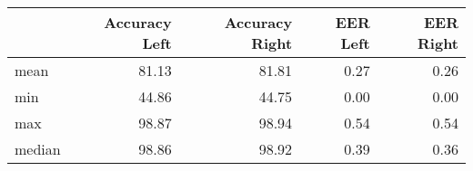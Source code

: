 \begin{tabular}{lrrrr}
\toprule
{} &  Accuracy Left &  Accuracy Right &  EER Left &  EER Right \\
\midrule
mean   &          81.13 &           81.81 &      0.27 &       0.26 \\
min    &          44.86 &           44.75 &      0.00 &       0.00 \\
max    &          98.87 &           98.94 &      0.54 &       0.54 \\
median &          98.86 &           98.92 &      0.39 &       0.36 \\
\bottomrule
\end{tabular}

